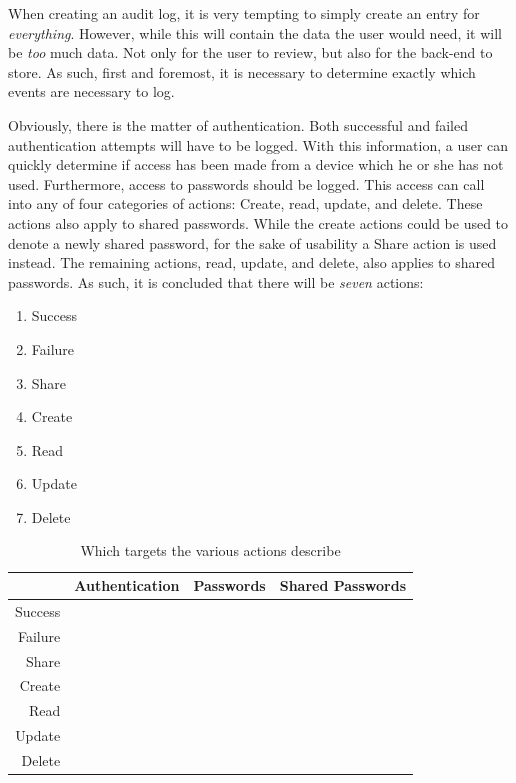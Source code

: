 		When creating an audit log, it is very tempting to simply create an entry for \emph{everything}. However, while this will contain the data the user would need, it will be \emph{too} much data. Not only for the user to review, but also for the back-end to store. As such, first and foremost, it is necessary to determine exactly which events are necessary to log.

		Obviously, there is the matter of authentication. Both successful and failed authentication attempts will have to be logged. With this information, a user can quickly determine if access has been made from a device which he or she has not used. Furthermore, access to passwords should be logged. This access can call into any of four categories of actions: Create, read, update, and delete. These actions also apply to shared passwords. While the create actions could be used to denote a newly shared password, for the sake of usability a Share action is used instead. The remaining actions, read, update, and delete, also applies to shared passwords. As such, it is concluded that there will be \emph{seven} actions:
		\begin{enumerate}
			\item Success
			\item Failure
			\item Share
			\item Create
			\item Read
			\item Update
			\item Delete
		\end{enumerate}

		\begin{table}
			\begin{tabular}{r | c | c | c }
							& \textbf{Authentication} 		& \textbf{Passwords} 		& \textbf{Shared Passwords} 	\\
				\hline
				Success 	& \cmark 						& \xmark 					& \xmark 						\\
				Failure 	& \cmark 						& \xmark 					& \xmark 						\\
				Share 		& \xmark 						& \xmark 					& \cmark 						\\
				Create 		& \xmark 						& \cmark 					& \xmark 						\\
				Read 		& \xmark 						& \cmark 					& \cmark 						\\
				Update 		& \xmark 						& \cmark 					& \cmark 						\\
				Delete 		& \xmark 						& \cmark 					& \cmark 						\\
			\end{tabular}
			\caption{Which targets the various actions describe}
			\label{table:actions}
		\end{table}

